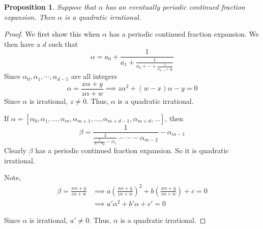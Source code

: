 \documentclass{article}
\newtheorem*{prop}{Proposition}
\theoremstyle{definition}\newtheorem{definition}{Definition}
\begin{document}
	\begin{prop}
		Suppose that $\alpha$ has an eventually periodic continued fraction expansion. Then $\alpha$ is a quadratic irrational.
	\end{prop}
	\begin{proof}
		We first show this when $\alpha$ has a periodic continued fraction expansion. We then have a $d$ such that
		$$
		\alpha = a _ { 0 } + \frac { 1 } { a _ { 1 } + \frac { 1 } { a _ { 2 } + \cdots + \frac { 1 } { a _ { d - 1 } + \frac { 1 } { \alpha } } } }
		$$
		Since $\alpha_0,\alpha_1, \cdots, \alpha_{d-1}$ are all integers
		$$
		\alpha=\frac{x\alpha+y}{z\alpha+w} \implies z\alpha^2+(w-x)\alpha-y=0
		$$
		Since $\alpha$ is irrational, $z \neq 0$. Thus, $\alpha$ is a quadratic irrational.
		
		If $\alpha=[\alpha_0,\alpha_1,\ldots,\alpha_m,\alpha_{m+1},\ldots,\alpha_{m+d-1},\alpha_{m+d},\ldots]$, then 
		$$
		\beta=\frac{1}{\frac{1}{\frac{1}{\alpha-\alpha_{0}}-\alpha_{1}}-\cdots-\alpha_{m-2}}-\alpha_{m-1}
		$$
		Clearly $\beta$ has a periodic continued fraction expansion. So it is quadratic irrational.
		
		Note,
		\begin{align*}
			\beta=\frac{x\alpha+y}{z\alpha+w} &\implies a\left(\frac{x\alpha+y}{z\alpha+w}\right)^2+b\left(\frac{x\alpha+y}{z\alpha+w}\right)+c=0 \\
			&\implies a'\alpha^2+b'\alpha+c'=0
		\end{align*}
		
		Since $\alpha$ is irrational, $a' \neq 0$. Thus, $\alpha$ is a quadratic irrational.
		
	\end{proof}
			
\end{document}
